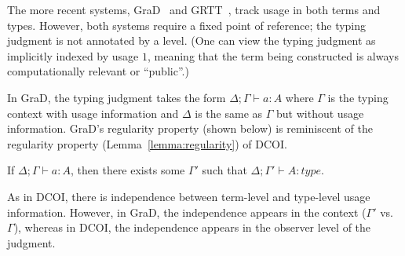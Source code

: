 \documentclass[acmsmall]{acmart}
\newcommand{\yl}[1]{}
\newcommand{\name}{DCOI\xspace}
\begin{document}
%

The more recent systems, GraD~\citep{weirich:graded-haskell} and
GRTT~\citep{moon2021graded}, track usage in both terms and types. However,
both systems require a fixed point of reference; the typing judgment is not
annotated by a level. (One can view the typing judgment as implicitly indexed
by usage $1$, meaning that the term being constructed is always
computationally relevant or ``public''.)

In GraD, the typing judgment takes the form $\Delta; \Gamma \vdash a : A$
where $\Gamma$ is the typing context with usage information and $\Delta$ is
the same as $\Gamma$ but without usage information. GraD's regularity property
(shown below) is reminiscent of the regularity property
(Lemma~\ref{lemma:regularity}) of \name{}.
\begin{lemma}
If $\Delta; \Gamma \vdash a : A$, then there exists some $\Gamma'$
such that $\Delta;\Gamma' \vdash A : type$.
\end{lemma}
As in \name{}, there is independence between term-level and type-level usage
information. However, in GraD, the independence appears in the context
($\Gamma'$ vs. $\Gamma$), whereas in \name{}, the independence appears in the
observer level of the judgment.
\end{document}

